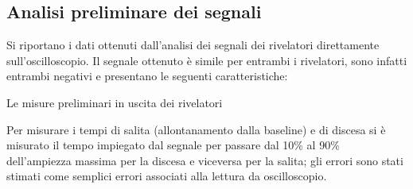 
%
\subsection{Analisi preliminare dei segnali}

Si riportano i dati ottenuti dall'analisi dei segnali dei rivelatori direttamente sull'oscilloscopio. Il segnale
ottenuto è simile per entrambi i rivelatori, sono infatti entrambi negativi e presentano le seguenti caratteristiche:\\

%
\begin{table}[h]
	\centering
	
	\caption{Le misure preliminari in uscita dei rivelatori}
	\label{tab:calib_pre}
\end{table}
%

Per misurare i tempi di salita (allontanamento dalla baseline) e di discesa si è misurato il tempo impiegato dal segnale per passare dal 10\% al 90\% dell'ampiezza
massima per la discesa e viceversa per la salita; gli errori sono stati stimati come semplici errori associati alla lettura da oscilloscopio.\\


